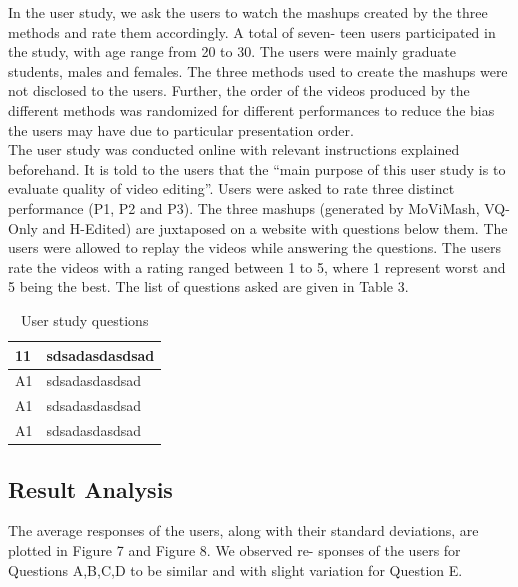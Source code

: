 \documentclass{sig-alternate}
\begin{document}
In the user study, we ask the users to watch the mashups created
by the three methods and rate them accordingly. A total of seven-
teen users participated in the study, with age range from 20 to 30.
The users were mainly graduate students, males and females. The
three methods used to create the mashups were not disclosed to the
users. Further, the order of the videos produced by the different
methods was randomized for different performances to reduce the
bias the users may have due to particular presentation order.\\
The user study was conducted online with relevant instructions
explained beforehand. It is told to the users that the \enquote{main purpose of this user study is to evaluate quality of video editing}. Users
were asked to rate three distinct performance (P1, P2 and P3). The
three mashups (generated by MoViMash, VQ-Only and H-Edited)
are juxtaposed on a website with questions below them. The users were allowed to replay the videos while answering the questions.
The users rate the videos with a rating ranged between 1 to 5, where
1 represent worst and 5 being the best. The list of questions asked
are given in Table 3.

\begin{table}
\centering
\caption{User study questions }
\begin{tabular}{p{1.2cm}|p{3.8cm}} \hline
11& sdsadasdasdsad\\ \hline
A1 & sdsadasdasdsad\\ \hline
A1 &sdsadasdasdsad\\ \hline
A1 &sdsadasdasdsad\\ \hline
\end{tabular}
\end{table}

\subsection{Result Analysis}

The average responses of the users, along with their standard
deviations, are plotted in Figure 7 and Figure 8. We observed re-
sponses of the users for Questions A,B,C,D to be similar and with
slight variation for Question E.
\end{document}
